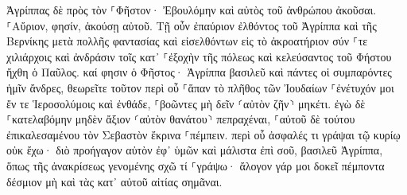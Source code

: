 \documentclass[twoside, 9pt]{extreport}
\begin{document}
Ἀγρίππας δὲ πρὸς τὸν ⸀Φῆστον· Ἐβουλόμην καὶ αὐτὸς τοῦ ἀνθρώπου ἀκοῦσαι. ⸀Αὔριον, φησίν, ἀκούσῃ αὐτοῦ. 
Τῇ οὖν ἐπαύριον ἐλθόντος τοῦ Ἀγρίππα καὶ τῆς Βερνίκης μετὰ πολλῆς φαντασίας καὶ εἰσελθόντων εἰς τὸ ἀκροατήριον σύν ⸀τε χιλιάρχοις καὶ ἀνδράσιν τοῖς κατ᾽ ⸀ἐξοχὴν τῆς πόλεως καὶ κελεύσαντος τοῦ Φήστου ἤχθη ὁ Παῦλος. 
καί φησιν ὁ Φῆστος· Ἀγρίππα βασιλεῦ καὶ πάντες οἱ συμπαρόντες ἡμῖν ἄνδρες, θεωρεῖτε τοῦτον περὶ οὗ ⸀ἅπαν τὸ πλῆθος τῶν Ἰουδαίων ⸀ἐνέτυχόν μοι ἔν τε Ἱεροσολύμοις καὶ ἐνθάδε, ⸀βοῶντες μὴ δεῖν ⸂αὐτὸν ζῆν⸃ μηκέτι. 
ἐγὼ δὲ ⸀κατελαβόμην μηδὲν ἄξιον ⸂αὐτὸν θανάτου⸃ πεπραχέναι, ⸀αὐτοῦ δὲ τούτου ἐπικαλεσαμένου τὸν Σεβαστὸν ἔκρινα ⸀πέμπειν. 
περὶ οὗ ἀσφαλές τι γράψαι τῷ κυρίῳ οὐκ ἔχω· διὸ προήγαγον αὐτὸν ἐφ᾽ ὑμῶν καὶ μάλιστα ἐπὶ σοῦ, βασιλεῦ Ἀγρίππα, ὅπως τῆς ἀνακρίσεως γενομένης σχῶ τί ⸀γράψω· 
ἄλογον γάρ μοι δοκεῖ πέμποντα δέσμιον μὴ καὶ τὰς κατ᾽ αὐτοῦ αἰτίας σημᾶναι. 
\end{document}
